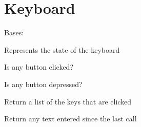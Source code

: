 \documentclass[letterpaper,10pt,english]{sphinxmanual}
\begin{document}
\begin{fulllineitems}
\end{fulllineitems}



\section{Keyboard}
\label{input:keyboard}

\begin{fulllineitems}
\label{input:serge.input.Keyboard}
Bases: {\hyperref[common:serge.common.Loggable]{}}

Represents the state of the keyboard

\begin{fulllineitems}
\label{input:serge.input.Keyboard.areAnyClicked}
Is any button clicked?

\end{fulllineitems}


\begin{fulllineitems}
\label{input:serge.input.Keyboard.areAnyDown}
Is any button depressed?

\end{fulllineitems}


\begin{fulllineitems}
\label{input:serge.input.Keyboard.getClicked}
Return a list of the keys that are clicked

\end{fulllineitems}


\begin{fulllineitems}
\label{input:serge.input.Keyboard.getTextEntered}
Return any text entered since the last call

\end{fulllineitems}


\end{fulllineitems}
\end{document}
